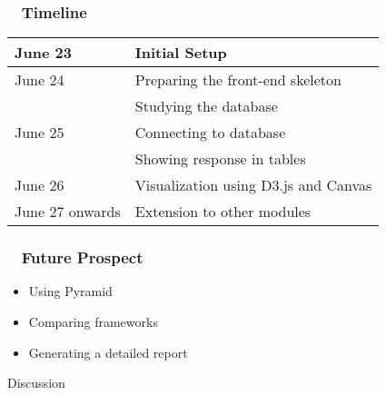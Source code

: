 \documentclass{beamer}
\begin{document}
%




\begin{frame}
\frametitle{~ Timeline}
\begin{center}

\begin{tabular}{|l|l|}
     \hline
     June 23 & Initial Setup\\
     \hline
     June 24 & Preparing the front-end skeleton\\
     \hline & Studying the database\\
     \hline
     June 25 & Connecting to database\\
     \hline & Showing response in tables\\
     \hline
     June 26 & Visualization using D3.js and Canvas\\
     \hline
     June 27 onwards & Extension to other modules\\
     \hline
     
\end{tabular}
\end{center}    
\end{frame}

\begin{frame}
\frametitle{ ~ Future Prospect} 
\begin{itemize}
\item{Using Pyramid}
\item{Comparing frameworks}
\item{Generating a detailed report}
\end{itemize}
\end{frame}



\begin{frame}
\begin{center}
\Huge{Discussion}
\end{center}
\end{frame}

\end{document}
